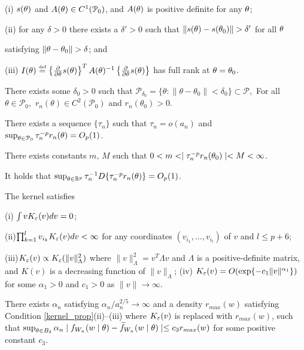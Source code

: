 	 (i) $s({}{\theta})$
	and $A({}{\theta})\in C^{1}(\mathcal{P}_{0})$, and $A({}{\theta})$ is
	positive definite for any ${}{\theta}$; 
	
	 (ii) for any $\delta>0$ there
	exists a $\delta'>0$ such that $\|s(\btheta)-s(\btheta_{0})\|>\delta'$
	for all ${}{\theta}$ 
	
	satisfying $\|\btheta-\btheta_{0}\|>\delta$; and
	
	 (iii) $I(\theta)\stackrel{\hbox{\tiny def}} = \left\{ \frac{\partial}{\partial\theta}s(\theta)\right\} ^{T}A(\theta)^{-1}\left\{ \frac{\partial}{\partial\theta}s(\theta)\right\} $
	has full rank at ${}{\theta}={}{\theta}_{0}$.
 


 There exists some $\delta_0 > 0$ such that $\mathcal{P}_{\delta_0} = \{\theta: \| \theta-\theta_0\|  < \delta_0  \} \subset \mathcal{P},$ 
For all $\theta \in \mathcal{P}_{0},$ $r_{n}(\theta) \in C^2(\mathcal{P}_{0})$ and $r_{n}(\theta_0)>0$.

	
 There exists a sequence $\{\tau_{n}\}$  
such that $\tau_{n}=o(a_n)$ and $\sup_{{}{\theta}\in {\cal P}_{0}}\tau_{n}^{-p}r_{n}({}{\theta})=O_{p}(1)$.


 There exists constants $m$, $M$ such that $0 < m <\mid \tau_{n}^{-p}r_{n}({}{\theta}_{0})\mid < M < \infty$.


 It holds that $\sup_{{}{\theta}\in\mathbb{R}^{p}}\tau_{n}^{-1} D\{\tau_{n}^{-p}r_{n}({}{\theta})\}=O_{p}(1)$.

\begin{condition} \label{kernel_prop}
	The kernel satisfies 
	
	 (i) $\int vK_{\varepsilon}(v)dv=0$; 
	
	 (ii)$\prod_{k=1}^{l}v_{i_{k}}K_{\varepsilon}(v)dv<\infty$
	for any coordinates $(v_{i_{1}},\dots,v_{i_{l}})$ of $v$ and $l\leq p+6$;
	
	 (iii)$K_{\varepsilon}(v)\propto K_{\varepsilon}(\|v\|_{\Lambda}^{2})$ where $\|v\|_{\Lambda}^{2}=v^{T}\Lambda v$
	and $\Lambda$ is a positive-definite matrix, and $K(v)$ is a decreasing
	function of $\|v\|_{\Lambda}$; (iv) $K_{\varepsilon}(v)=O(\exp\{-c_{1}\|v\|^{\alpha_{1}}\})$
	for some $\alpha_{1}>0$ and $c_{1}>0$ as $\|v\|\rightarrow\infty$. 
\end{condition}

\begin{condition} \label{sum_approx}
	There exists $\alpha_{n}$ satisfying $\alpha_{n}/a_{n}^{2/5}\rightarrow\infty$
	and a density $r_{max}(w)$ satisfying Condition \ref{kernel_prop}(ii)--(iii) where $K_{\varepsilon}(v)$
	is replaced with $r_{max}(w)$, such that $\sup_{\theta\in B_{\delta}}\alpha_{n}\mid f_{W_{n}}(w\mid\theta)-\widetilde{f}_{W_{n}}(w\mid\theta)\mid\leq c_{3}r_{max}(w)$
	for some positive constant $c_{3}$. 
\end{condition}

